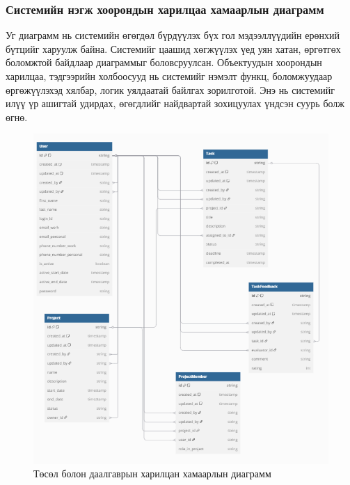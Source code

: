 \subsubsection{Системийн нэгж хоорондын харилцаа хамаарлын диаграмм}
Уг диаграмм нь системийн өгөгдөл бүрдүүлэх бүх гол мэдээллүүдийн ерөнхий
бүтцийг харуулж байна. Системийг цаашид хөгжүүлэх үед уян хатан, өргөтгөх боломжтой
байдлаар диаграммыг боловсруулсан. Объектуудын хоорондын харилцаа, тэдгээрийн
холбоосууд нь системийг нэмэлт функц, боломжуудаар өргөжүүлэхэд хялбар, логик
уялдаатай байлгах зорилготой. Энэ нь системийг илүү үр ашигтай удирдах, өгөгдлийг
найдвартай зохицуулах үндсэн суурь болж өгнө.
\begin{figure}[H]
    \centering
    \includegraphics[scale=0.8]{src/images/diagram/projectTaskErd.png}
    \caption{Төсөл болон даалгаврын харилцан хамаарлын диаграмм}
    \label{fig:project_task_erd}
\end{figure}
